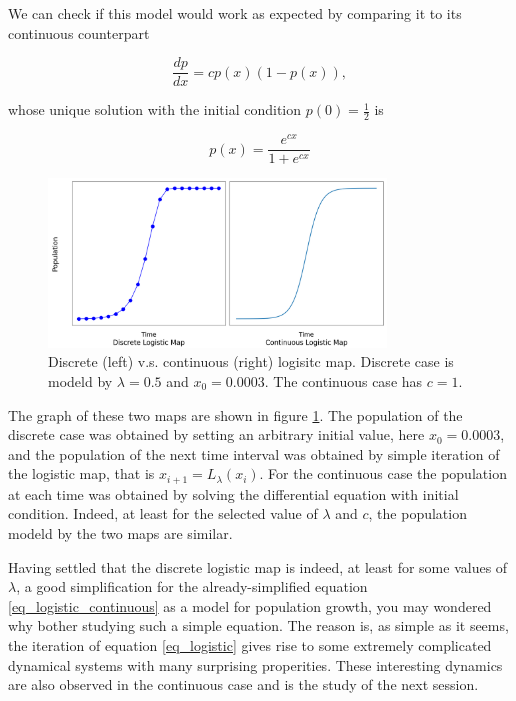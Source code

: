 We can check if this model would work as expected by comparing it to its continuous counterpart 

\begin{equation}\label{eq_logistic_continuous}
	\frac{dp}{dx} = c p(x) (1-p(x)),
\end{equation}

whose unique solution with the initial condition $p(0) = \frac{1}{2}$ is 

$$
p(x) = \frac{e^{cx}}{1+e^{cx}}
$$

\begin{figure}[b!]
	\centering
	\includegraphics[width=0.8\textwidth]{./figures/con_vs_discrete_logistic_map.png}
	\caption{Discrete (left) v.s. continuous (right) logisitc map. Discrete case is modeld by $\lambda = 0.5$ and $x_0 = 0.0003$. The continuous case has $c=1$.}
	\label{fig:con_vs_discrete}
\end{figure}

The graph of these two maps are shown in figure \ref{fig:con_vs_discrete}.
The population of the discrete case was obtained by setting an arbitrary initial value, here $x_0 = 0.0003$, and the population of the next time interval was obtained by simple iteration of the logistic map, that is $x_{i+1} = L_{\lambda}(x_i)$.
For the continuous case the population at each time was obtained by solving the differential equation with initial condition.
Indeed, at least for the selected value of $\lambda$ and $c$, the population modeld by the two maps are similar.

Having settled that the discrete logistic map is indeed, at least for some values of $\lambda$, a good simplification for the already-simplified equation \ref{eq_logistic_continuous} as a model for population growth, you may wondered why bother studying such a simple equation. 
The reason is, as simple as it seems, the iteration of equation \ref{eq_logistic} gives rise to some extremely complicated dynamical systems with many surprising properities. 
These interesting dynamics are also observed in the continuous case and is the study of the next session.

